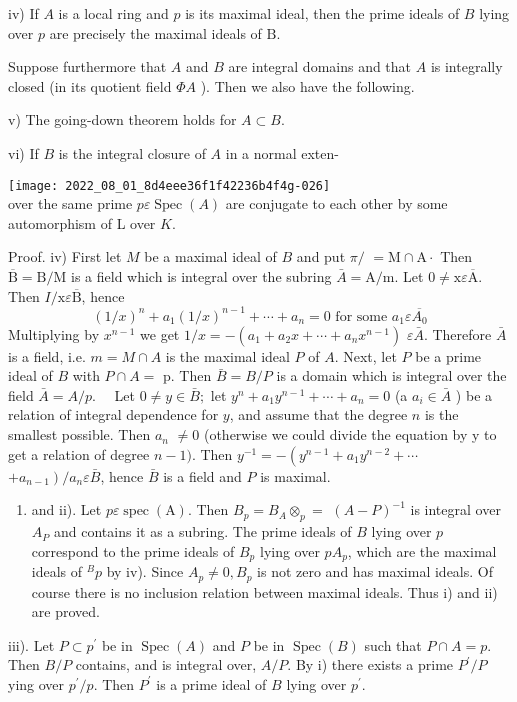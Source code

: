 iv) If $A$ is a local ring and $p$ is its maximal ideal, then the prime ideals of $B$ lying over $p$ are precisely the maximal ideals of $\mathrm{B} .$

Suppose furthermore that $A$ and $B$ are integral domains and that $A$ is integrally closed (in its quotient field $\Phi A$ ). Then we also have the following.

v) The going-down theorem holds for $A \subset B$.

vi) If $B$ is the integral closure of $A$ in a normal exten-

\texttt{[image: 2022\_08\_01\_8d4eee36f1f42236b4f4g-026]}\\
over the same prime $p \varepsilon \operatorname{Spec}(A)$ are conjugate to each other by some automorphism of L over $K$.

Proof. iv) First let $M$ be a maximal ideal of $B$ and put $\pi /$ $=\mathrm{M} \cap \mathrm{A} \cdot$ Then $\overline{\mathrm{B}}=\mathrm{B} / \mathrm{M}$ is a field which is integral over the subring $\bar{A}=\mathrm{A} / \mathrm{m}$. Let $0 \neq \mathrm{x} \varepsilon \overline{\mathrm{A}}$. Then $I / \mathrm{x} \varepsilon \overline{\mathrm{B}}$, hence
$$
(1 / x)^{n}+a_{1}(1 / x)^{n-1}+\cdots+a_{n}=0 \text { for some } a_{1} \varepsilon \overline{A_{0}}
$$
Multiplying by $x^{n-1}$ we get $1 / x=-\left(a_{1}+a_{2} x+\cdots+a_{n} x^{n-1}\right)$ $\varepsilon \bar{A}$. Therefore $\bar{A}$ is a field, i.e. $m=M \cap A$ is the maximal ideal $P$ of $A$. Next, let $P$ be a prime ideal of $B$ with $P \cap A=$ p. Then $\bar{B}=B / P$ is a domain which is integral over the field $\bar{A}=A / p . \quad$ Let $0 \neq y \in \bar{B} ;$ let $y^{n}+a_{1} y^{n-1}+\cdots+a_{n}=0$ (a $a_{i} \in \bar{A}$ ) be a relation of integral dependence for $y$, and assume that the degree $n$ is the smallest possible. Then $a_{n}$ $\neq 0$ (otherwise we could divide the equation by y to get a relation of degree $n-1)$. Then $y^{-1}=-\left(y^{n-1}+a_{1} y^{n-2}+\cdots\right.$ $\left.+a_{n-1}\right) / a_{n} \varepsilon \bar{B}$, hence $\bar{B}$ is a field and $P$ is maximal.

\begin{enumerate}
  \item and ii). Let $p \varepsilon \operatorname{spec}(\mathrm{A})$. Then $B_{p}=B_{A} \otimes_{p}=$ $(A-P)^{-1}$ is integral over $A_{P}$ and contains it as a subring. The prime ideals of $B$ lying over $p$ correspond to the prime ideals of $B_{p}$ lying over $p A_{p}$, which are the maximal ideals of ${ }^{B} p$ by iv). Since $A_{p} \neq 0, B_{p}$ is not zero and has maximal ideals. Of course there is no inclusion relation between maximal ideals. Thus i) and ii) are proved.
\end{enumerate}
iii). Let $P \subset p^{\prime}$ be in $\operatorname{Spec}(A)$ and $P$ be in $\operatorname{Spec}(B)$ such that $P \cap A=p$. Then $B / P$ contains, and is integral over, $A / P$. By i) there exists a prime $P^{\prime} / P$ ying over $p^{\prime} / p$. Then $P^{\prime}$ is a prime ideal of $B$ lying over $p^{\prime}$.

